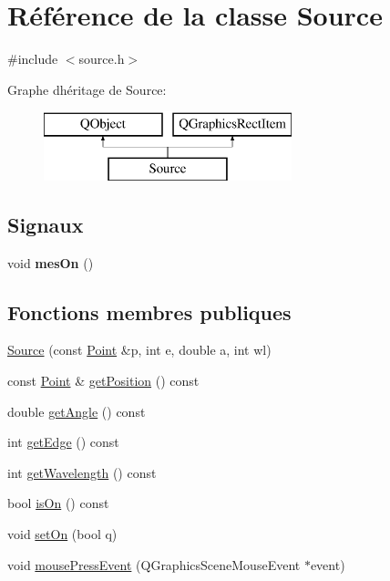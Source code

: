 \hypertarget{class_source}{}\section{Référence de la classe Source}
\label{class_source}


{\ttfamily \#include $<$source.\+h$>$}

Graphe d\textquotesingle{}héritage de Source\+:\begin{figure}[H]
\begin{center}
\leavevmode
\includegraphics[height=2.000000cm]{class_source}
\end{center}
\end{figure}
\subsection*{Signaux}
\begin{DoxyCompactItemize}
\item 
\mbox{\label{class_source_a9ed44e2a5da1e07c6f3557f1a2e61dfa}} 
void {\bfseries mes\+On} ()
\end{DoxyCompactItemize}
\subsection*{Fonctions membres publiques}
\begin{DoxyCompactItemize}
\item 
\mbox{\hyperlink{class_source_abac037335dd35772aa077ab3d27ee5b2}{Source}} (const \mbox{\hyperlink{class_point}{Point}} \&p, int e, double a, int wl)
\item 
const \mbox{\hyperlink{class_point}{Point}} \& \mbox{\hyperlink{class_source_a7d96a9cb9f3b28d3a4339a441f65e99a}{get\+Position}} () const
\item 
double \mbox{\hyperlink{class_source_a2759f418c910f00d2b9a5776fd5ad10b}{get\+Angle}} () const
\item 
int \mbox{\hyperlink{class_source_ac0eb63fd20a777608037681bbdeccc91}{get\+Edge}} () const
\item 
int \mbox{\hyperlink{class_source_a41452078cbe06622e2fc9f724dc473bc}{get\+Wavelength}} () const
\item 
bool \mbox{\hyperlink{class_source_a5a4edb05f29a47b66464d9d35883b68c}{is\+On}} () const
\item 
void \mbox{\hyperlink{class_source_ae990a8cb9cb54507c34ba56e9e0ab30c}{set\+On}} (bool q)
\item 
void \mbox{\hyperlink{class_source_aeaa4bce4230961fb2334b9a2321df9fd}{mouse\+Press\+Event}} (Q\+Graphics\+Scene\+Mouse\+Event $\ast$event)
\end{DoxyCompactItemize}
